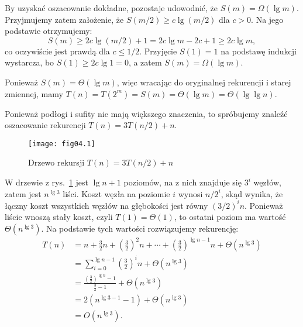 By uzyskać oszacowanie dokładne, pozostaje udowodnić, że $S(m)=\Omega(\lg m)$. Przyjmujemy zatem założenie, że $S(m/2)\ge c\lg(m/2)$ dla $c>0$. Na jego podstawie otrzymujemy:
\[
	S(m) \ge 2c\lg(m/2)+1 = 2c\lg m-2c+1 \ge 2c\lg m,
\]
co oczywiście jest prawdą dla $c\le1/2$. Przyjęcie $S(1)=1$ na podstawę indukcji wystarcza, bo $S(1)\ge2c\lg1=0$, a zatem $S(m)=\Omega(\lg m)$.

Ponieważ $S(m)=\Theta(\lg m)$, więc wracając do oryginalnej rekurencji i starej zmiennej, mamy $T(n)=T(2^m)=S(m)=\Theta(\lg m)=\Theta(\lg\lg n)$.


\exercise %
Ponieważ podłogi i sufity nie mają większego znaczenia, to spróbujemy znaleźć oszacowanie rekurencji $T(n)=3T(n/2)+n$.
\begin{figure}[ht]
	\begin{center}
		\texttt{[image: fig04.1]}
	\end{center}
	\caption{Drzewo rekursji $T(n)=3T(n/2)+n$} \label{fig:4.2-1}
\end{figure}
W drzewie z rys.~\ref{fig:4.2-1} jest $\lg n+1$ poziomów, na  z nich znajduje się $3^i$ węzłów, zatem jest $n^{\lg3}$ liści. Koszt węzła na poziomie $i$ wynosi $n/2^i$, skąd wynika, że łączny koszt wszystkich węzłów na  głębokości jest równy $(3/2)^in$. Ponieważ liście wnoszą stały koszt, czyli $T(1)=\Theta(1)$, to ostatni poziom ma wartość $\Theta(n^{\lg3})$. Na podstawie tych wartości rozwiązujemy rekurencję:
\begin{align*}
	T(n) &= n+\frac{3}{2}n+\left(\frac{3}{2}\right)^2n+\cdots+\left(\frac{3}{2}\right)^{\lg n-1}n+\Theta(n^{\lg 3}) \\
	&= \sum_{i=0}^{\lg n-1}\left(\frac{3}{2}\right)^in+\Theta(n^{\lg 3}) \\
	&= \frac{\left(\frac{3}{2}\right)^{\lg n}-1}{\frac{3}{2}-1}+\Theta(n^{\lg 3}) \\
	&= 2(n^{\lg 3-1}-1)+\Theta(n^{\lg 3}) \\
	&= O(n^{\lg 3}).
\end{align*}

